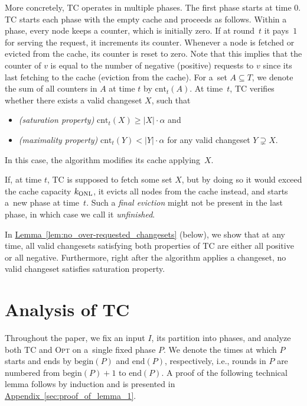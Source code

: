 \documentclass[sigconf,screen=true]{acmart}
\newcommand{\lref}[2][]{\hyperref[#2]{#1~\ref*{#2}}}
\newcommand{\ALG}{\textsc{TC}\xspace}
\newcommand{\OPT}{\textsc{Opt}\xspace}
\newcommand{\cnt}{\textrm{cnt}}
\newcommand{\beP}{\textrm{begin}(P)}
\newcommand{\enP}{\textrm{end}(P)}
\newcommand{\kALG}{k_\textnormal{ONL}}
\begin{document}
More concretely, \ALG operates in multiple phases. The first phase starts at time $0$.
\ALG starts each phase with the empty cache and proceeds as follows. Within a
phase, every node keeps a counter, which is initially zero. If at round~$t$ it
pays~$1$ for serving the request, it increments its counter. Whenever a node
is fetched or evicted from the cache, its counter is reset to zero. Note that
this implies that the counter of $v$ is equal to the number of negative
(positive) requests to $v$ since its last fetching to the cache (eviction from
the cache). For a~set $A \subseteq T$, we denote the sum of all counters in
$A$ at time $t$ by $\cnt_t(A)$. At time~$t$, \ALG verifies whether
there exists a valid changeset $X$, such that
\begin{itemize}
\item \emph{(saturation property)} $\cnt_t(X) \geq |X| \cdot \alpha$ and
\item \emph{(maximality property)} $\cnt_t(Y) < |Y| \cdot \alpha$ for any valid
  changeset $Y \supsetneq X$.
\end{itemize}
In this case, the algorithm modifies its cache applying~$X$. 

If, at time $t$, \ALG is supposed to fetch some set $X$, but by doing so it
would exceed the cache capacity $\kALG$, it evicts all nodes from the cache
instead, and starts a~new phase at time~$t$. Such a \emph{final eviction}
might not be present in the last phase, in which case we call it
\emph{unfinished}. 


In \lref[Lemma]{lem:no_over-requested_changesets} (below), we show that at any
time, all valid changesets satisfying both properties of \ALG are either all
positive or all negative. Furthermore, right after the algorithm applies a
changeset, no valid changeset satisfies saturation property.



\section{Analysis of TC}
\label{sec:analysis}

Throughout the paper, we fix an input $I$, its partition into phases, and
analyze both \ALG and \OPT on a~single fixed phase $P$. We denote the times at
which $P$ starts and ends by $\beP$ and $\enP$, respectively, i.e., rounds in
$P$ are numbered from $\beP+1$ to $\enP$. A proof of the following technical
lemma follows by induction and is presented in 
\lref[Appendix]{sec:proof_of_lemma_1}.
\end{document}
